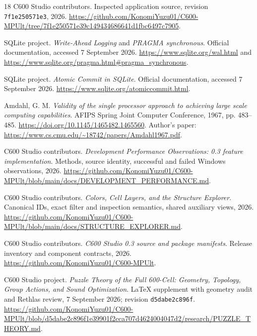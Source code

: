 \documentclass[a4paper,11pt]{article}
\begin{document}
\begin{thebibliography}{18}
C600 Studio contributors. Inspected application source, revision \texttt{7f1e250571e3}, 2026. \url{https://github.com/KonomiYuzu01/C600-MPUlt/tree/7f1e250571e39c149434686641d1fbc6497c7905}.

SQLite project. \emph{Write-Ahead Logging} and \emph{PRAGMA synchronous}. Official documentation, accessed 7 September 2026. \url{https://www.sqlite.org/wal.html} and \url{https://www.sqlite.org/pragma.html#pragma_synchronous}.

SQLite project. \emph{Atomic Commit in SQLite}. Official documentation, accessed 7 September 2026. \url{https://www.sqlite.org/atomiccommit.html}.

Amdahl, G. M. \emph{Validity of the single processor approach to achieving large scale computing capabilities}. AFIPS Spring Joint Computer Conference, 1967, pp. 483--485. \url{https://doi.org/10.1145/1465482.1465560}. Author's paper: \url{https://www.cs.cmu.edu/~18742/papers/Amdahl1967.pdf}.

C600 Studio contributors. \emph{Development Performance Observations: 0.3 feature implementation}. Methods, source identity, successful and failed Windows observations, 2026. \url{https://github.com/KonomiYuzu01/C600-MPUlt/blob/main/docs/DEVELOPMENT_PERFORMANCE.md}.

C600 Studio contributors. \emph{Colors, Cell Layers, and the Structure Explorer}. Canonical IDs, exact filter and inspection semantics, shared auxiliary views, 2026. \url{https://github.com/KonomiYuzu01/C600-MPUlt/blob/main/docs/STRUCTURE_EXPLORER.md}.

C600 Studio contributors. \emph{C600 Studio 0.3 source and package manifests}. Release inventory and component contracts, 2026. \url{https://github.com/KonomiYuzu01/C600-MPUlt}.

C600 Studio project. \emph{Puzzle Theory of the Full 600-Cell: Geometry, Topology, Group Actions, and Sound Optimization}. LaTeX supplement with geometry audit and Rethlas review, 7 September 2026; revision \texttt{d5dabe2c896f}. \url{https://github.com/KonomiYuzu01/C600-MPUlt/blob/d5dabe2c896f1e39901f2cca707d4624004047d2/research/PUZZLE_THEORY.md}.

\end{thebibliography}
\endgroup
\end{document}
